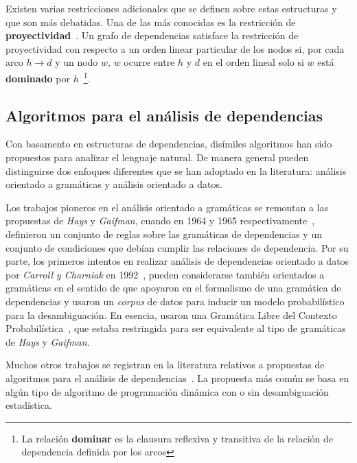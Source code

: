Existen varias restricciones adicionales que se definen sobre estas estructuras y que son más debatidas.
Una de las más conocidas es la restricción de \textbf{proyectividad}~\cite{hays1964dependency,lecerf1960programme,marcus1965notion}.
Un grafo de dependencias satisface la restricción de proyectividad con respecto a un orden linear particular de los nodos si, por cada arco $h \rightarrow d$ y un nodo $w$, $w$ ocurre entre $h$ y $d$ en el orden lineal solo si $w$ está \textbf{dominado} por $h$~\footnote{La relación \textbf{dominar} es la clausura reflexiva y transitiva de la relación de dependencia definida por los arcos}. 

\subsection{Algoritmos para el análisis de dependencias}

Con basamento en estructuras de dependencias, disímiles algoritmos han sido propuestos para analizar el lenguaje natural.
De manera general pueden distinguirse dos enfoques diferentes que se han adoptado en la literatura: análisis orientado a gramáticas y análisis orientado a datos. 

Los trabajos pioneros en el análisis orientado a gramáticas se remontan a las propuestas de \textit{Hays} y \textit{Gaifman}, cuando en 1964 y 1965 respectivamente~\cite{hays1964dependency,gaifman1965dependency}, definieron un conjunto de reglas sobre las gramáticas de dependencias y un conjunto de condiciones que debían cumplir las relaciones de dependencia.
Por su parte, los primeros intentos en realizar análisis de dependencias orientado a datos por \textit{Carroll y Charniak} en 1992~\cite{carroll1992two}, pueden considerarse también orientados a gramáticas en el sentido de que apoyaron en el formalismo de una gramática de dependencias y usaron un \emph{corpus} de datos para inducir un modelo probabilístico para la desambiguación.
En esencia, usaron una Gramática Libre del Contexto Probabilística~\cite{chomsky1956three}, que estaba restringida para ser equivalente al tipo de gramáticas de \textit{Hays} y \textit{Gaifman}. 

Muchos otros trabajos se registran en la literatura relativos a propuestas de algoritmos para el análisis de dependencias~\cite{koo2008simple,mcdonald2005non,nivre2003efficient,nivre2007maltparser,socher2011parsing}.
La propuesta más común se basa en algún tipo de algoritmo de programación dinámica con o sin desambiguación estadística.


